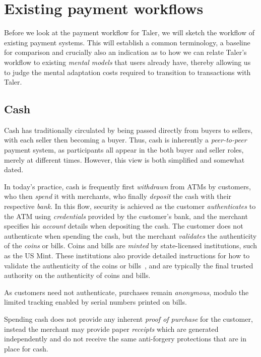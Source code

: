 \documentclass{IEEEtran}
\begin{document}
\section{Existing payment workflows}

Before we look at the payment workflow for Taler, we will sketch
the workflow of existing payment systems. This will establish
a common terminology, a baseline for comparison and crucially
also an indication as to how we can relate Taler's workflow to
existing {\em mental models} that users already have, thereby
allowing us to judge the mental adaptation costs required to
transition to transactions with Taler.

\subsection{Cash}

Cash has traditionally circulated by being passed directly from buyers
to sellers, with each seller then becoming a buyer. Thus, cash is
inherently a {\em peer-to-peer} payment system, as participants all
appear in the both buyer and seller roles, merely at different times.
However, this view is both simplified and
somewhat dated.

In today's practice, cash is frequently first {\em withdrawn} from
ATMs by customers, who then {\em spend} it with merchants, who finally
{\em deposit} the cash with their respective {\em bank}.  In this
flow, security is achieved as the customer {\em authenticates} to the
ATM using {\em credentials} provided by the customer's bank, and the
merchant specifies his {\em account} details when depositing the cash.
The customer does not authenticate when spending the cash, but the
merchant {\em validates} the authenticity of the {\em coins} or bills.
Coins and bills are {\em minted} by state-licensed institutions, such
as the US Mint.  These institutions also provide detailed instructions
for how to validate the authenticity of the coins or
bills~\cite{ezb2016ourmoney}, and are typically the final trusted
authority on the authenticity of coins and bills.

As customers need not authenticate, purchases remain {\em
anonymous}, modulo the limited tracking enabled by serial numbers
printed on bills.~\cite{pets2004kuegler}

Spending cash does not provide any inherent {\em proof of purchase}
for the customer, instead the merchant may provide paper
{\em receipts} which are generated independently and do not receive
the same anti-forgery protections that are in place for cash.
\end{document}
